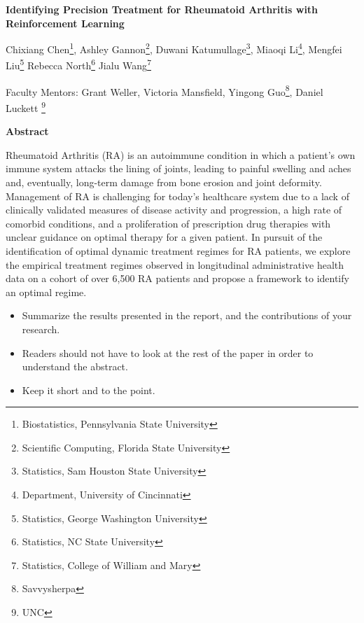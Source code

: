 \documentclass[10pt]{article}
\begin{document}
\centerline{\large \bf Identifying Precision Treatment for Rheumatoid Arthritis with Reinforcement Learning}

\vspace{.1truein}

\def\thefootnote{\arabic{footnote}}
\begin{center}
  Chixiang Chen\footnote{Biostatistics, Pennsylvania State University},
  Ashley Gannon\footnote{Scientific Computing, Florida State University},
  Duwani Katumullage\footnote{Statistics, Sam Houston State University},
  Miaoqi Li\footnote{Department, University of Cincinnati},
  Mengfei Liu\footnote{Statistics, George Washington University}
  Rebecca North\footnote{Statistics, NC State University}
  Jialu Wang\footnote{Statistics, College of William and Mary}
\end{center}


\begin{center}
Faculty Mentors: Grant Weller, Victoria Mansfield, Yingong Guo\footnote{Savvysherpa},
Daniel Luckett \footnote{UNC}
\end{center}

\vspace{.3truein}
\centerline{\bf Abstract}

Rheumatoid Arthritis (RA) is an autoimmune condition in which a patient's own immune system attacks the lining of joints, leading to painful swelling and aches and, eventually, long-term damage from bone erosion and joint deformity. Management of RA is challenging for today's healthcare system due to a lack of clinically validated measures of disease activity and progression, a high rate of comorbid conditions, and a proliferation of prescription drug therapies with unclear guidance on optimal therapy for a given patient. In pursuit of the identification of optimal dynamic treatment regimes for RA patients, we explore the empirical treatment regimes observed in longitudinal administrative health data on a cohort of over 6,500 RA patients and propose a framework to identify an optimal regime.

\begin{itemize}
\item Summarize the results presented in the report, and the contributions
of your research.

\item Readers should not have to look at the rest of the paper in order to 
understand the abstract.

\item Keep it short and to the point.
\end{itemize}
\end{document}
